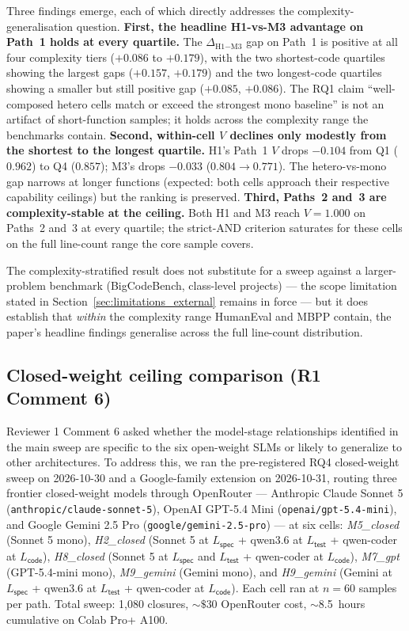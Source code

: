 Three findings emerge, each of which directly addresses the complexity-generalisation question. \textbf{First, the headline H1-vs-M3 advantage on Path~1 holds at every quartile.} The $\Delta_{\text{H1}-\text{M3}}$ gap on Path~1 is positive at all four complexity tiers ($+0.086$ to $+0.179$), with the two shortest-code quartiles showing the largest gaps ($+0.157$, $+0.179$) and the two longest-code quartiles showing a smaller but still positive gap ($+0.085$, $+0.086$). The RQ1 claim ``well-composed hetero cells match or exceed the strongest mono baseline'' is not an artifact of short-function samples; it holds across the complexity range the benchmarks contain. \textbf{Second, within-cell $V$ declines only modestly from the shortest to the longest quartile.} H1's Path~1 $V$ drops $-0.104$ from Q1 ($0.962$) to Q4 ($0.857$); M3's drops $-0.033$ ($0.804 \to 0.771$). The hetero-vs-mono gap narrows at longer functions (expected: both cells approach their respective capability ceilings) but the ranking is preserved. \textbf{Third, Paths~2 and~3 are complexity-stable at the ceiling.} Both H1 and M3 reach $V = 1.000$ on Paths~2 and~3 at every quartile; the strict-AND criterion saturates for these cells on the full line-count range the core sample covers.

The complexity-stratified result does not substitute for a sweep against a larger-problem benchmark (BigCodeBench, class-level projects) --- the scope limitation stated in Section~\ref{sec:limitations_external} remains in force --- but it does establish that \emph{within} the complexity range HumanEval and MBPP contain, the paper's headline findings generalise across the full line-count distribution.

\subsection{Closed-weight ceiling comparison (R1 Comment 6)}
\label{sec:results_rq4_closed_ceiling}

Reviewer 1 Comment 6 asked whether the model-stage relationships identified in the main sweep are specific to the six open-weight SLMs or likely to generalize to other architectures. To address this, we ran the pre-registered RQ4 closed-weight sweep on 2026-10-30 and a Google-family extension on 2026-10-31, routing three frontier closed-weight models through OpenRouter --- Anthropic Claude Sonnet 5 (\texttt{anthropic/claude-sonnet-5}), OpenAI GPT-5.4 Mini (\texttt{openai/gpt-5.4-mini}), and Google Gemini 2.5 Pro (\texttt{google/gemini-2.5-pro}) --- at six cells: \emph{M5\_closed} (Sonnet 5 mono), \emph{H2\_closed} (Sonnet 5 at $L_{\textsf{spec}}$ + qwen3.6 at $L_{\textsf{test}}$ + qwen-coder at $L_{\textsf{code}}$), \emph{H8\_closed} (Sonnet 5 at $L_{\textsf{spec}}$ and $L_{\textsf{test}}$ + qwen-coder at $L_{\textsf{code}}$), \emph{M7\_gpt} (GPT-5.4-mini mono), \emph{M9\_gemini} (Gemini mono), and \emph{H9\_gemini} (Gemini at $L_{\textsf{spec}}$ + qwen3.6 at $L_{\textsf{test}}$ + qwen-coder at $L_{\textsf{code}}$). Each cell ran at $n = 60$ samples per path. Total sweep: 1,080 closures, $\sim$$\$30$ OpenRouter cost, $\sim$8.5~hours cumulative on Colab Pro+ A100.

